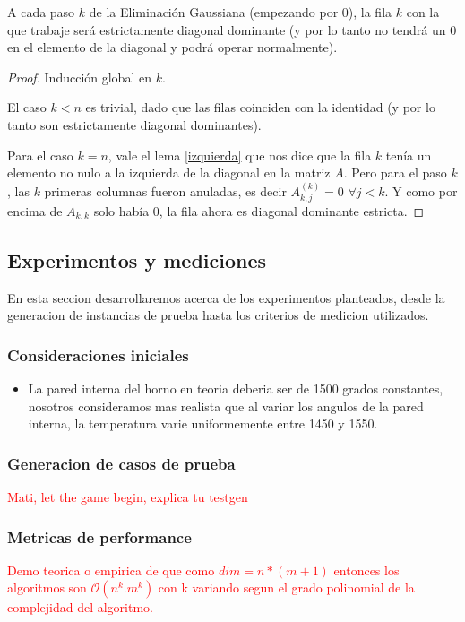 \begin{proposition}\label{pivoteo}
 A cada paso $k$ de la Eliminación Gaussiana (empezando por 0), la fila $k$ con la que trabaje será estrictamente diagonal dominante (y por lo tanto no tendrá un 0 en el elemento de la diagonal y podrá operar normalmente).
\end{proposition}
\begin{proof}
 Inducción global en $k$.
 
 El caso $k < n$ es trivial, dado que las filas coinciden con la identidad (y por lo tanto son estrictamente diagonal dominantes).
 
 Para el caso $k = n$, vale el lema \ref{izquierda} que nos dice que la fila $k$ tenía un elemento no nulo a la izquierda de la diagonal en la matriz $A$. Pero para el paso $k$, las $k$ primeras columnas fueron anuladas, es decir $A_{k,j}^{(k)}=0$ $\forall j < k$. Y como por encima de $A_{k,k}$ solo había 0, la fila ahora es diagonal dominante estricta.
 
\end{proof}

\subsection{Experimentos y mediciones}
En esta seccion desarrollaremos acerca de los experimentos planteados, desde la generacion de instancias de prueba hasta los criterios de medicion utilizados.
\subsubsection{Consideraciones iniciales}
\begin{itemize}
    \item La pared interna del horno en teoria deberia ser de 1500 grados constantes, nosotros consideramos mas realista que al variar los angulos de la pared interna, la temperatura varie uniformemente entre 1450 y 1550.
\end{itemize}

\subsubsection{Generacion de casos de prueba}
\textcolor{red}{Mati, let the game begin, explica tu testgen}

\subsubsection{Metricas de performance}
\textcolor{red}{Demo teorica o empirica de que como $dim = n*(m+1)$ entonces los algoritmos son $\mathcal{O}(n^k.m^k)$ con k variando segun el grado polinomial de la complejidad del algoritmo.}

